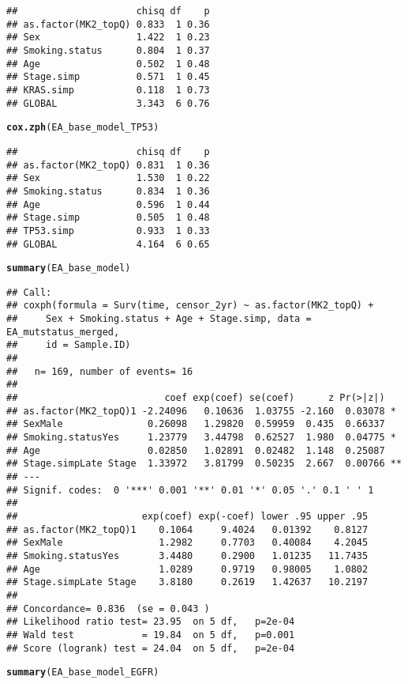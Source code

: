 \documentclass{article}\usepackage[]{graphicx}\usepackage[]{color}
\makeatletter
\newcommand{\hlstd}[1]{\textcolor[rgb]{0.345,0.345,0.345}{#1}}%
\newcommand{\hlkwd}[1]{\textcolor[rgb]{0.737,0.353,0.396}{\textbf{#1}}}%
\newenvironment{kframe}{%
 \def\at@end@of@kframe{}%
 \ifinner\ifhmode%
  \def\at@end@of@kframe{\end{minipage}}%
  \begin{minipage}{\columnwidth}%
 \fi\fi%
 \def\FrameCommand##1{\hskip\@totalleftmargin \hskip-\fboxsep
 \colorbox{shadecolor}{##1}\hskip-\fboxsep
     \hskip-\linewidth \hskip-\@totalleftmargin \hskip\columnwidth}%
 \MakeFramed {\advance\hsize-\width
   \@totalleftmargin\z@ \linewidth\hsize
   \@setminipage}}%
 {\par\unskip\endMakeFramed%
 \at@end@of@kframe}
\newenvironment{knitrout}{}{} %
\makeatother
\begin{document}
\begin{knitrout}
\begin{kframe}
\begin{verbatim}
##                     chisq df    p
## as.factor(MK2_topQ) 0.833  1 0.36
## Sex                 1.422  1 0.23
## Smoking.status      0.804  1 0.37
## Age                 0.502  1 0.48
## Stage.simp          0.571  1 0.45
## KRAS.simp           0.118  1 0.73
## GLOBAL              3.343  6 0.76
\end{verbatim}
\begin{alltt}
\hlkwd{cox.zph}\hlstd{(EA_base_model_TP53)}
\end{alltt}
\begin{verbatim}
##                     chisq df    p
## as.factor(MK2_topQ) 0.831  1 0.36
## Sex                 1.530  1 0.22
## Smoking.status      0.834  1 0.36
## Age                 0.596  1 0.44
## Stage.simp          0.505  1 0.48
## TP53.simp           0.933  1 0.33
## GLOBAL              4.164  6 0.65
\end{verbatim}
\begin{alltt}
\hlkwd{summary}\hlstd{(EA_base_model)}
\end{alltt}
\begin{verbatim}
## Call:
## coxph(formula = Surv(time, censor_2yr) ~ as.factor(MK2_topQ) + 
##     Sex + Smoking.status + Age + Stage.simp, data = EA_mutstatus_merged, 
##     id = Sample.ID)
## 
##   n= 169, number of events= 16 
## 
##                          coef exp(coef) se(coef)      z Pr(>|z|)   
## as.factor(MK2_topQ)1 -2.24096   0.10636  1.03755 -2.160  0.03078 * 
## SexMale               0.26098   1.29820  0.59959  0.435  0.66337   
## Smoking.statusYes     1.23779   3.44798  0.62527  1.980  0.04775 * 
## Age                   0.02850   1.02891  0.02482  1.148  0.25087   
## Stage.simpLate Stage  1.33972   3.81799  0.50235  2.667  0.00766 **
## ---
## Signif. codes:  0 '***' 0.001 '**' 0.01 '*' 0.05 '.' 0.1 ' ' 1
## 
##                      exp(coef) exp(-coef) lower .95 upper .95
## as.factor(MK2_topQ)1    0.1064     9.4024   0.01392    0.8127
## SexMale                 1.2982     0.7703   0.40084    4.2045
## Smoking.statusYes       3.4480     0.2900   1.01235   11.7435
## Age                     1.0289     0.9719   0.98005    1.0802
## Stage.simpLate Stage    3.8180     0.2619   1.42637   10.2197
## 
## Concordance= 0.836  (se = 0.043 )
## Likelihood ratio test= 23.95  on 5 df,   p=2e-04
## Wald test            = 19.84  on 5 df,   p=0.001
## Score (logrank) test = 24.04  on 5 df,   p=2e-04
\end{verbatim}
\begin{alltt}
\hlkwd{summary}\hlstd{(EA_base_model_EGFR)}

\end{alltt}
\end{kframe}
\end{knitrout}
\end{document}
